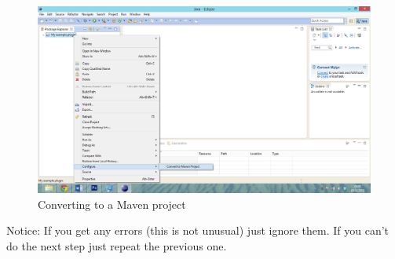 \begin{figure}[h]
	\centering
		\includegraphics[width=\textwidth]{converttomavenproject}
	\caption{Converting to a Maven project}
	\label{fig:converttomavenproject}
\end{figure}

Notice: If you get any errors (this is not unusual) just ignore them. If you can't do the next step just repeat the previous one.



